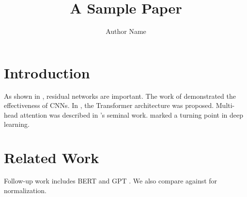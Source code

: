 \documentclass{article}
\title{A Sample Paper}
\author{Author Name}
\begin{document}
\maketitle

\section{Introduction}
As shown in \cite{he2016deep}, residual networks are important.
The work of \citet{krizhevsky2012imagenet} demonstrated the effectiveness of CNNs.
In \citep{vaswani2017attention}, the Transformer architecture was proposed.
Multi-head attention was described in \citeauthor{vaswani2017attention}'s seminal work.
\citeyear{he2016deep} marked a turning point in deep learning.

\section{Related Work}
Follow-up work includes BERT \cite{devlin2018bert} and GPT \cite{radford2018improving,brown2020language}.
We also compare against \parencite{ioffe2015batch} for normalization.



\end{document}
